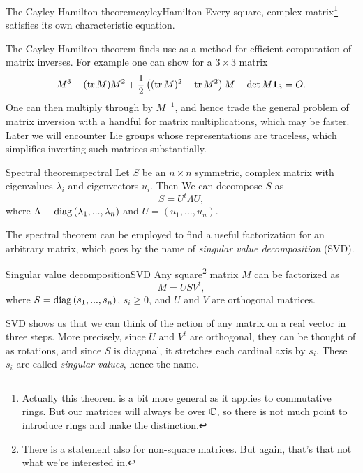 \begin{theorem}{The Cayley-Hamilton theorem}{cayleyHamilton}
Every square, complex matrix\footnote{Actually this theorem is
a bit more general as it applies to commutative rings.
But our matrices will always be over $\mathbb{C}$, so there is not
much point to introduce rings and make the distinction.} 
satisfies its own characteristic equation.
\end{theorem}

The Cayley-Hamilton theorem finds use as a method for
efficient computation of matrix inverses. For
example one can show for a $3\times 3$ matrix
\begin{equation}\label{eq:inv3x3CH}
M^3-(\tr M) M^2+\frac{1}{2}\left((\tr M)^2-\tr M^2\right) M
-\det M  {\mathbf 1}_3=O.
\end{equation}
One can then multiply through by $M^{-1}$, and hence trade
the general problem of matrix inversion with a handful for matrix
multiplications, which may be faster.
Later we will encounter Lie groups whose representations
are traceless, which simplifies inverting such
matrices substantially.

\begin{theorem}{Spectral theorem}{spectral}
Let $S$ be an $n\times n$ symmetric, complex matrix with
eigenvalues $\lambda_i$ and eigenvectors $u_i$. Then
We can decompose $S$ as
$$
S=U^t\Lambda U,
$$
where $\Lambda\equiv\mathop{\mathrm{diag}}\left(\lambda_1,...,\lambda_n\right)$ and
$U=\left(u_1,...,u_n\right)$.
\end{theorem}

The spectral theorem can be employed to find a useful
factorization for an arbitrary matrix, which goes by
the name of 
{\it singular value decomposition} (SVD).
\begin{theorem}{Singular value decomposition}{SVD}
Any square\footnote{There is a statement also for non-square matrices.
But again, that's that not what we're interested in.}
matrix $M$ can be factorized as
$$
M=USV^t,
$$
where $S=\mathop{\mathrm{diag}}\left(s_1,...,s_n\right)$, $s_i\geq 0$,
and $U$ and $V$ are orthogonal matrices.
\end{theorem} 
SVD shows us that we can think of the action of any matrix on a real vector 
in three steps. More precisely, since $U$ and 
$V^t$ are orthogonal, they can be thought of
as rotations, and since $S$ is diagonal, it stretches each cardinal axis 
by $s_i$. These $s_i$ are called {\it singular values},
hence the name.


